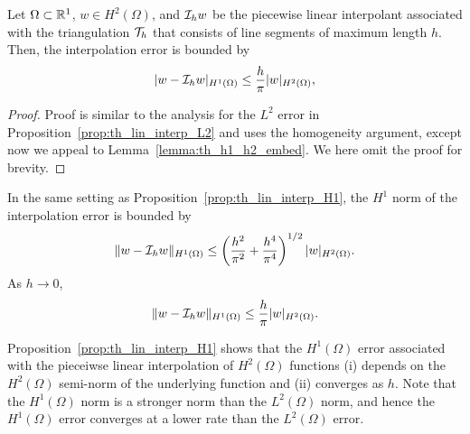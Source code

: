 \begin{proposition}
  \label{prop:th_lin_interp_H1}
  Let $\Omega \subset \mathbb{R}^1$, $w \in H^2(\Omega)$, and $\mathcal{I}_h w$ be the piecewise linear interpolant associated with the triangulation $\mathcal{T}_h$ that consists of line segments of maximum length $h$. Then, the interpolation error is bounded by
  \begin{equation*}
    | w - \mathcal{I}_h w |_{H^1(\Omega)}
    \leq \frac{h}{\pi} | w |_{H^2(\Omega)},
  \end{equation*}
  \begin{proof}
    Proof is similar to the analysis for the $L^2$ error in Proposition~\ref{prop:th_lin_interp_L2} and uses the homogeneity argument, except now we appeal to Lemma~\ref{lemma:th_h1_h2_embed}. We here omit the proof for brevity.
  \end{proof}
\end{proposition}
\begin{corollary}
  In the same setting as Proposition~\ref{prop:th_lin_interp_H1}, the $H^1$ norm of the interpolation error is bounded by
  \begin{equation*}
    \|w - \mathcal{I}_h w \|_{H^1(\Omega)} \leq  \left(  \frac{h^2}{\pi^2} +  \frac{h^4}{\pi^4} \right)^{1/2} | w |_{H^2(\Omega)}.
  \end{equation*}
  As $h \to 0$, 
  \begin{equation*}
    \|w - \mathcal{I}_h w \|_{H^1(\Omega)} \leq  \frac{h}{\pi}  | w |_{H^2(\Omega)}.
  \end{equation*}
\end{corollary}
Proposition~\ref{prop:th_lin_interp_H1} shows that the $H^1(\Omega)$ error associated with the pieceiwse linear interpolation of $H^2(\Omega)$ functions (i) depends on the $H^2(\Omega)$ semi-norm of the underlying function and (ii) converges as $h$. Note that the $H^1(\Omega)$ norm is a stronger norm than the $L^2(\Omega)$ norm, and hence the $H^1(\Omega)$ error converges at a lower rate than the $L^2(\Omega)$ error.

